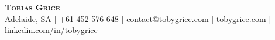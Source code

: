 \begin{center}
    \textbf{\Huge \scshape Tobias Grice} \\ \vspace{1pt}
    \small Adelaide, SA $|$ \href{tel:+61452576648}{+61 452 576 648} $|$ \href{mailto:contact@tobygrice.com}{contact@tobygrice.com} $|$
    \href{https://www.tobygrice.com}{tobygrice.com} $|$
    \href{https://www.linkedin.com/in/tobygrice/}{linkedin.com/in/tobygrice}
\end{center}
